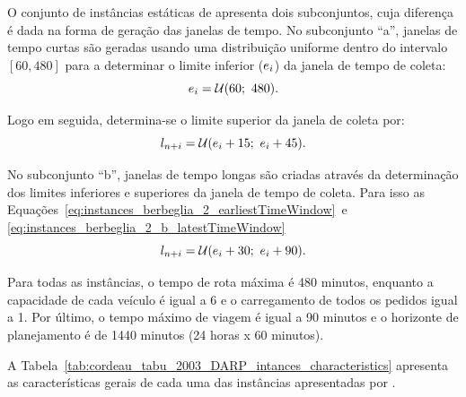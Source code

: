 O conjunto de instâncias estáticas de \textcite{cordeau_tabu_2003} apresenta
dois subconjuntos, cuja diferença é dada na forma de geração das janelas de
tempo.
No subconjunto ``a'', janelas de tempo curtas são geradas usando uma
distribuição uniforme dentro do intervalo $[60, 480]$ para a determinar o 
limite inferior ($e_i$) da janela de tempo de 
coleta:
%
\begin{equation}
  e_i = \mathcal{U}(60;\ 480).
  \label{eq:instances_berbeglia_2_earliestTimeWindow}
\end{equation}

\noindent Logo em seguida, determina-se o limite superior da janela de coleta 
por:
%
\begin{equation}
  l_{n + i}  = \mathcal{U}(e_i + 15;\ e_i + 45).
  \label{eq:instances_berbeglia_2_a_latestTimeWindow}
\end{equation}

\noindent No subconjunto ``b'', janelas de tempo longas são criadas através da
determinação dos limites inferiores e superiores da janela de tempo de coleta.
Para isso as Equações~\ref{eq:instances_berbeglia_2_earliestTimeWindow}~e
\ref{eq:instances_berbeglia_2_b_latestTimeWindow}
%
\begin{equation}
  l_{n + i} = 
  \mathcal{U}(e_i + 30;\ e_i + 90).
  \label{eq:instances_berbeglia_2_b_latestTimeWindow}
\end{equation}

\noindent Para todas as instâncias, o tempo de rota máxima é 480 minutos, enquanto a
capacidade de cada veículo é igual a 6 e o carregamento de todos os pedidos
igual a 1.
Por último, o tempo máximo de viagem é igual a 90 minutos e o horizonte de
planejamento é de 1440 minutos (24 horas x 60 minutos).

A Tabela~\ref{tab:cordeau_tabu_2003_DARP_intances_characteristics} apresenta as
características gerais de cada uma das instâncias apresentadas por
\textcite{cordeau_tabu_2003}.

